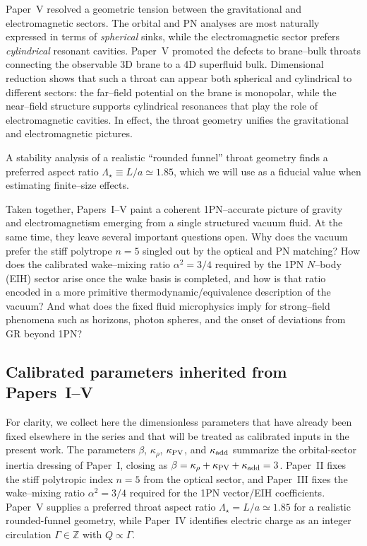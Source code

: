 \documentclass[11pt]{article}
\begin{document}
Paper~V resolved a geometric tension between the gravitational and
electromagnetic sectors.\cite{Norris:Paper5}
The orbital and PN analyses are most naturally expressed in terms of
\emph{spherical} sinks, while the electromagnetic sector prefers
\emph{cylindrical} resonant cavities.  Paper~V promoted the defects to
brane--bulk throats connecting the observable 3D brane to a 4D superfluid
bulk.  Dimensional reduction shows that such a throat can appear both
spherical and cylindrical to different sectors: the far--field potential on
the brane is monopolar, while the near--field structure supports cylindrical
resonances that play the role of electromagnetic cavities.  In effect, the
throat geometry unifies the gravitational and electromagnetic pictures.

A stability analysis of a realistic ``rounded funnel'' throat geometry finds a preferred
aspect ratio \(\Lambda_\star \equiv L/a \simeq 1.85\), which we will use as a fiducial
value when estimating finite--size effects.

Taken together, Papers~I--V paint a coherent 1PN--accurate picture of
gravity and electromagnetism emerging from a single structured vacuum
fluid.  At the same time, they leave several important questions open.
Why does the vacuum prefer the stiff polytrope $n=5$ singled out by the
optical and PN matching?  How does the calibrated wake--mixing ratio
$\alpha^2=3/4$ required by the 1PN $N$--body (EIH) sector arise once the
wake basis is completed, and how is that ratio encoded in a more primitive
thermodynamic/equivalence description of the vacuum?  And what does the fixed fluid
microphysics imply for strong--field phenomena such as horizons, photon
spheres, and the onset of deviations from GR beyond 1PN?

\subsection{Calibrated parameters inherited from Papers~I--V}
\label{subsec:intro-params}

For clarity, we collect here the dimensionless parameters that have already
been fixed elsewhere in the series and that will be treated as calibrated
inputs in the present work.  The parameters \(\beta\), \(\kappa_{\rho}\),
\(\kappa_{\rm PV}\), and \(\kappa_{\rm add}\) summarize the orbital-sector
inertia dressing of Paper~I, closing as \(\beta=\kappa_{\rho}+\kappa_{\rm PV}+\kappa_{\rm add}=3\).
Paper~II fixes the stiff polytropic index \(n=5\) from the optical sector, and
Paper~III fixes the wake--mixing ratio \(\alpha^2=3/4\) required for the 1PN
vector/EIH coefficients.  Paper~V supplies a preferred throat aspect ratio
\(\Lambda_\star=L/a\simeq 1.85\) for a realistic rounded-funnel geometry, while
Paper~IV identifies electric charge as an integer circulation \(\Gamma\in\mathbb{Z}\) with \(Q\propto\Gamma\).
\end{document}
